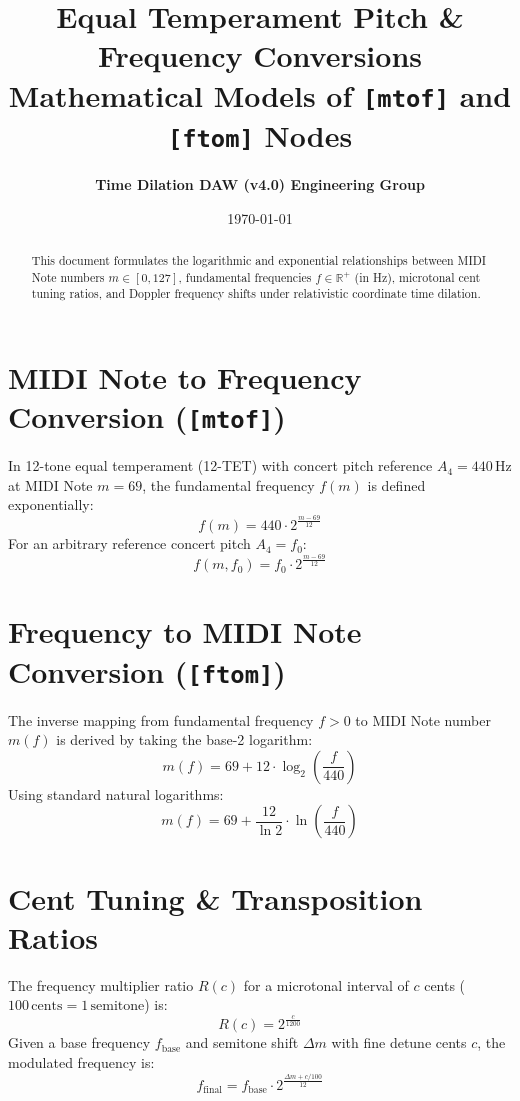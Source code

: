 \documentclass[11pt,a4paper]{article}
\title{\textbf{\Huge Equal Temperament Pitch \& Frequency Conversions}\\[0.5em]
\Large Mathematical Models of \texttt{[mtof]} and \texttt{[ftom]} Nodes}
\author{\textbf{Time Dilation DAW (v4.0) Engineering Group}}
\date{\today}
\begin{document}
\maketitle

\begin{abstract}
This document formulates the logarithmic and exponential relationships between MIDI Note numbers $m \in [0, 127]$, fundamental frequencies $f \in \mathbb{R}^+$ (in Hz), microtonal cent tuning ratios, and Doppler frequency shifts under relativistic coordinate time dilation.
\end{abstract}

\section{MIDI Note to Frequency Conversion (\texttt{[mtof]})}
In 12-tone equal temperament (12-TET) with concert pitch reference $A_4 = 440\,\text{Hz}$ at MIDI Note $m = 69$, the fundamental frequency $f(m)$ is defined exponentially:
\begin{equation}
f(m) = 440 \cdot 2^{\frac{m - 69}{12}}
\end{equation}
For an arbitrary reference concert pitch $A_4 = f_0$:
\begin{equation}
f(m, f_0) = f_0 \cdot 2^{\frac{m - 69}{12}}
\end{equation}

\section{Frequency to MIDI Note Conversion (\texttt{[ftom]})}
The inverse mapping from fundamental frequency $f > 0$ to MIDI Note number $m(f)$ is derived by taking the base-2 logarithm:
\begin{equation}
m(f) = 69 + 12 \cdot \log_2\left(\frac{f}{440}\right)
\end{equation}
Using standard natural logarithms:
\begin{equation}
m(f) = 69 + \frac{12}{\ln 2} \cdot \ln\left(\frac{f}{440}\right)
\end{equation}

\section{Cent Tuning \& Transposition Ratios}
The frequency multiplier ratio $R(c)$ for a microtonal interval of $c$ cents ($100\,\text{cents} = 1\,\text{semitone}$) is:
\begin{equation}
R(c) = 2^{\frac{c}{1200}}
\end{equation}
Given a base frequency $f_{\text{base}}$ and semitone shift $\Delta m$ with fine detune cents $c$, the modulated frequency is:
\begin{equation}
f_{\text{final}} = f_{\text{base}} \cdot 2^{\frac{\Delta m + c/100}{12}}
\end{equation}
\end{document}
